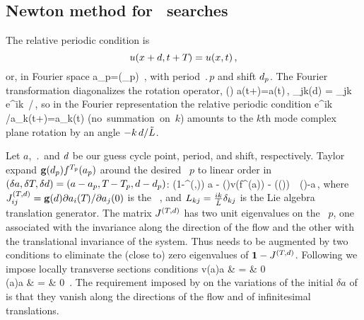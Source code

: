 

\subsection{Newton method  for \rpo\ searches}
\label{sec:NewtRPOs}



The relative periodic condition is
\[
    u(x+d,t+{T_{}})=u(x,t)
        \,,
\]
or, in Fourier space
\beq
    a_p=(\shift_p)   
\,,
    \label{eq:RPOcond}
\eeq
with period $\period{p}$ and shift $d_p$. 
The Fourier transformation diagonalizes the rotation operator, 
\beq
    (\shift)  a(t+\period{})=a(t)\,,\qquad
            _{jk}(d) = \delta_{jk} e^{ik\, \shift/\tildeL}\,,
    \label{eq:RPO}
\eeq
so in the Fourier representation the relative periodic condition
\beq
    e^{ik\, \shift /\tildeL}a_k(t+\period{})=a_k(t)  %
    \qquad \mbox{(no summation on $k$)}
    \label{eq:RPOcondition}
\eeq
amounts to the $k$th mode complex plane rotation by an 
angle $-k\, d /\tilde{L}$.

Let 
$a$, $\period{}$ and $d$ 
be our guess cycle point, period, and shift, respectively. 
Taylor expand $\mathbf{g}(d_p)  {f^{{T_{p}}}(a_p)}$ 
around the desired \rpo\ $p$ to linear order in
$(\delta a,\delta {T_{}},\delta d) 
   =(a-a_p,{T_{}} - {T_{p}},d-d_p)$:
\beq
    \left({1}-\jMps^{(\period{},\shift)}\right) \delta a 
   - (\shift)v(f^{\period{}}(a)) \delta \period{} 
                            - ((\shift))\delta \shift  
                    \,\simeq\, (\shift)-a\,,
    \label{eq:NewtonBasicCond}          
\eeq
where ${J}^{({T_{}},d)}_{ij} 
  = \mathbf{g}(d)\partial a_i({T_{}})/\partial a_j(0)$
is the \rpo\ {\jacobianM}, and
$L_{kj}=\frac{ik}{\tilde{L}}\delta_{kj}$ is the Lie algebra translation
generator. 
The matrix ${J}^{({T_{}},d)}$ 
has two unit eigenvalues on the \rpo\ $p$, 
one associated with the invariance along 
the direction of the flow and the other with the
translational invariance of the system. Thus  
needs to be augmented by two conditions to
eliminate the (close to) zero eigenvalues of 
$\mathbf{1}-{J}^{({T_{}},d)}$. Following 
 we impose locally transverse sections 
conditions 
\bea
    v(a)\cdot\delta a & = & 0 \label{eq:NewtonAux1} \,\\
    (a)\cdot \delta a & = & 0 
\,.
\label{eq:NewtonAux2}
\eea
The requirement imposed by 
on the variations of the initial $\delta a$ of  
is that they   vanish along the directions of the flow 
and of infinitesimal translations.

